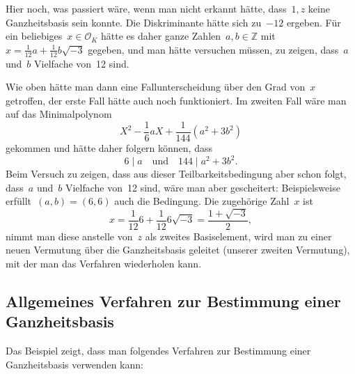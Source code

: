 \documentclass[12pt,a4paper,ngerman]{scrartcl}
\newcommand{\Z}{\mathbb{Z}}
\theoremstyle{definition}
\theoremstyle{plain}
\theoremstyle{remark}
\begin{document}
\begin{small}
Hier noch, was passiert wäre, wenn man nicht erkannt hätte, dass~$1,z$ keine
Ganzheitsbasis sein konnte. Die Diskriminante hätte sich zu~$-12$ ergeben. Für
ein beliebiges~$x \in \mathcal{O}_K$ hätte es daher ganze Zahlen~$a, b \in \Z$
mit~$x = \frac{1}{12}a + \frac{1}{12}b \sqrt{-3}$ gegeben, und man hätte
versuchen müssen, zu zeigen, dass~$a$ und~$b$ Vielfache von~12 sind.

Wie oben hätte man dann eine Fallunterscheidung über den Grad von~$x$
getroffen, der erste Fall hätte auch noch funktioniert. Im zweiten Fall wäre
man auf das Minimalpolynom
\[ X^2 - \frac{1}{6}aX + \frac{1}{144}(a^2 + 3b^2) \]
gekommen und hätte daher folgern können, dass
\[ 6 \mathrel{|} a \quad\text{und}\quad 144 \mathrel{|} a^2+3b^2. \]
Beim Versuch zu zeigen, dass aus dieser Teilbarkeitsbedingung aber schon folgt,
dass~$a$ und~$b$ Vielfache von~12 sind, wäre man aber gescheitert:
Beispielsweise erfüllt~$(a,b) = (6,6)$ auch die Bedingung. Die zugehörige
Zahl~$x$ ist
\[ x = \frac{1}{12}6 + \frac{1}{12}6 \sqrt{-3} = \frac{1 + \sqrt{-3}}{2}, \]
nimmt man diese anstelle von~$z$ als zweites Basiselement, wird man zu einer
neuen Vermutung über die Ganzheitsbasis geleitet (unserer zweiten Vermutung),
mit der man das Verfahren wiederholen kann.
\end{small}


\subsection*{Allgemeines Verfahren zur Bestimmung einer Ganzheitsbasis}

Das Beispiel zeigt, dass man folgendes Verfahren zur Bestimmung einer
Ganzheitsbasis verwenden kann:
\end{document}
